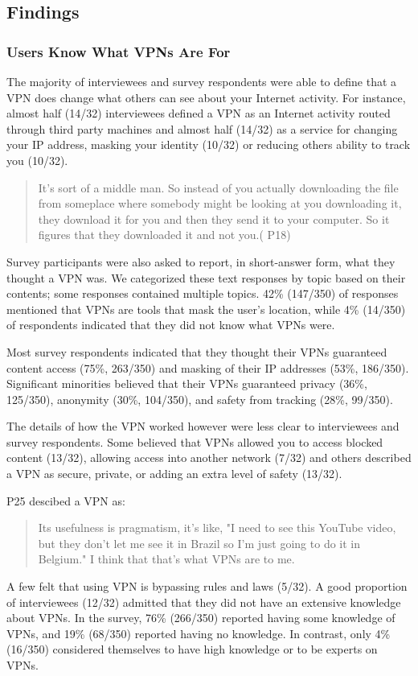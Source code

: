 \subsection{Findings}\label{sec:results}

\subsubsection{Users Know What VPNs Are For}

The majority of interviewees and survey respondents were able to define that a VPN does change what others can see about your Internet activity. For instance, almost half (14/32) interviewees defined a VPN as an
Internet activity routed through third party machines and almost half (14/32) as a service for changing your IP
address, masking your identity (10/32) or reducing others ability to track
you (10/32).  \begin{quote}It's sort of a middle man. So instead of you actually
downloading the file from someplace where somebody might be looking at you
downloading it, they download it for you and then they send it to your
computer. So it figures that they downloaded it and not you.( P18)\end{quote}

Survey participants were also asked to report, in short-answer form, what they
thought a VPN was. We categorized these text responses by topic based on their
contents; some responses contained multiple topics. 42\% (147/350) of
responses mentioned that VPNs are tools that mask the user’s location, while
4\% (14/350) of respondents indicated that they did not know what VPNs were.

Most survey respondents indicated that they thought their VPNs guaranteed content
access (75\%, 263/350) and masking of their IP addresses (53\%, 186/350).
Significant minorities believed that their VPNs guaranteed privacy (36\%,
125/350), anonymity (30\%, 104/350), and safety from tracking (28\%, 99/350).


The details of how the VPN worked however were less clear to interviewees and survey respondents. Some believed that VPNs allowed you to  access blocked content (13/32), allowing access into another network (7/32) and others described a VPN as secure,  private, or adding an extra level of safety (13/32).


P25 descibed a VPN as:
\begin{quote} Its usefulness is pragmatism, it's like, "I need to see this YouTube video, but they don't let me see it in Brazil so I'm just going to do it
    in Belgium." I think that that's what VPNs are to me. \end{quote}
A few felt  that using VPN is
bypassing rules and laws (5/32).  A good proportion of interviewees (12/32) admitted that they did not have an extensive knowledge
about VPNs. In the survey, 76\% (266/350) reported having some knowledge of
VPNs, and 19\% (68/350) reported having no knowledge. In contrast, only 4\%
(16/350) considered themselves to have high knowledge or to be experts on
VPNs.

